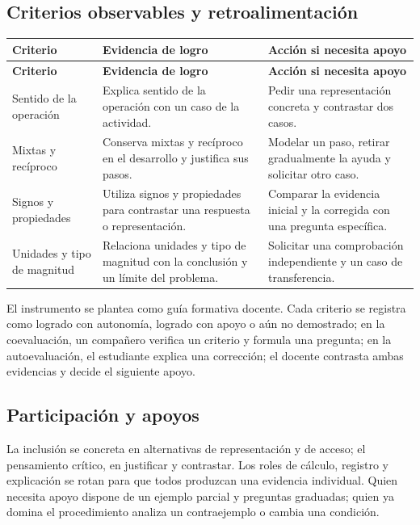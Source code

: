 \documentclass[spanish,letterpaper,oneside]{article}
\begin{document}
\subsection{Criterios observables y retroalimentación}

{\small{}\renewcommand{\arraystretch}{1.25}
\begin{longtable}{|>{\raggedright\arraybackslash}p{}|>{\raggedright\arraybackslash}p{}|>{\raggedright\arraybackslash}p{}|}\hline
\rowcolor{iiiepePale} \textbf{Criterio} & \textbf{Evidencia de logro} & \textbf{Acción si necesita apoyo} \\\hline
\endfirsthead
\hline
\rowcolor{iiiepePale} \textbf{Criterio} & \textbf{Evidencia de logro} & \textbf{Acción si necesita apoyo} \\\hline
\endhead
Sentido de la operación & Explica sentido de la operación con un caso de la actividad. & Pedir una representación concreta y contrastar dos casos. \\\hline
Mixtas y recíproco & Conserva mixtas y recíproco en el desarrollo y justifica sus pasos. & Modelar un paso, retirar gradualmente la ayuda y solicitar otro caso. \\\hline
Signos y propiedades & Utiliza signos y propiedades para contrastar una respuesta o representación. & Comparar la evidencia inicial y la corregida con una pregunta específica. \\\hline
Unidades y tipo de magnitud & Relaciona unidades y tipo de magnitud con la conclusión y un límite del problema. & Solicitar una comprobación independiente y un caso de transferencia. \\\hline
\end{longtable}}
El instrumento se plantea como guía formativa docente. Cada criterio se registra como logrado con autonomía, logrado con apoyo o aún no demostrado; en la coevaluación, un compañero verifica un criterio y formula una pregunta; en la autoevaluación, el estudiante explica una corrección; el docente contrasta ambas evidencias y decide el siguiente apoyo.\subsection{Participación y apoyos}
La inclusión se concreta en alternativas de representación y de acceso; el pensamiento crítico, en justificar y contrastar. Los roles de cálculo, registro y explicación se rotan para que todos produzcan una evidencia individual. Quien necesita apoyo dispone de un ejemplo parcial y preguntas graduadas; quien ya domina el procedimiento analiza un contraejemplo o cambia una condición.
\end{document}
